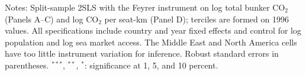 \begin{table}[htbp]
\begin{threeparttable}
\begin{tabular}{lcccc}
\bottomrule
\end{tabular}
\begin{tablenotes}[flushleft]
\footnotesize
\item Notes: Split-sample 2SLS with the Feyrer instrument on log total bunker CO$_2$ (Panels A--C) and log CO$_2$ per seat-km (Panel D); terciles are formed on 1996 values. All specifications include country and year fixed effects and control for log population and log sea market access. The Middle East and North America cells have too little instrument variation for inference. Robust standard errors in parentheses. $^{***}$, $^{**}$, $^{*}$: significance at 1, 5, and 10 percent.
\end{tablenotes}
\end{threeparttable}
\end{table}
